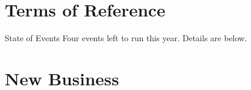 \documentclass[11pt,hacksoc]{meetingmins}
\begin{document}
\maketitle

\section{Terms of Reference}
\begin{items}

  \item {State of Events}
  \subitem Four events left to run this year. Details are below.

\end{items}

\section{New Business}
\end{document}
